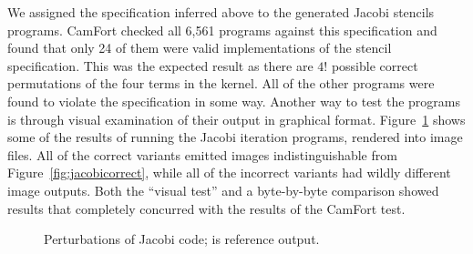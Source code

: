\documentclass[9pt,preprint]{sigplanconf}
\theoremstyle{definition}
\begin{document}
We assigned the specification inferred above to the generated Jacobi
stencils programs. CamFort checked all 6,561 programs against this specification and found that only 24 of them were
valid implementations of the stencil specification. This was the
expected result as there are $4!$ possible correct permutations
of the four terms in the kernel. All of the other programs were found
to violate the specification in some way. Another way to test the
programs is through visual examination of their output in graphical
format. Figure~\ref{fig:jacobi} shows some of the results of running
the Jacobi iteration programs, rendered into image files. All of the
correct variants emitted images indistinguishable from
Figure~\ref{fig:jacobicorrect}, while all of the incorrect variants
had wildly different image outputs. Both the ``visual test'' and a
byte-by-byte comparison showed results that completely concurred with
the results of the CamFort test.

\begin{figure}[t]
  \centering
  \;\;
  \;\;
  \;\;
  \caption{Perturbations of Jacobi code;  is reference output.}
  \label{fig:jacobi}
  \vspace{-1em}
\end{figure}
\end{document}
